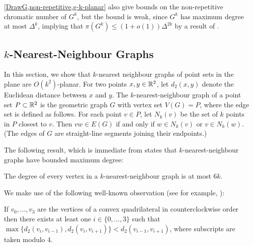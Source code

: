\documentclass{patmorin}
\renewcommand{\le}{\leqslant}
\renewcommand{\leq}{\leqslant}
\begin{document}
\cref{DrawG,non-repetitive,g-k-planar} also give bounds on the non-repetitive chromatic number of $G^k$, 
but the bound is weak, since $G^k$ has maximum degree at most $\Delta^k$, implying that $\pi(G^k) \leq (1+o(1))\Delta^{2k}$ by a result of \citet{DJKW16}.


\subsection{$k$-Nearest-Neighbour Graphs}

In this section, we show that $k$-nearest neighbour graphs of point sets in the plane are $O(k^2)$-planar.  For two points $x,y\in\mathbb{R}^2$, let $d_2(x,y)$ denote the Euclidean distance between $x$ and $y$. The $k$-nearest-neighbour graph of a point set $P\subset\mathbb{R}^2$ is the geometric graph $G$ with vertex set $V(G)=P$, where the edge set is defined as follows. For each point $v\in P$, let $N_k(v)$ be the set of $k$ points in $P$ closest to $v$. Then $vw\in E(G)$ if and only if $w\in N_k(v)$ or $v\in N_k(w)$. 
(The edges of $G$ are straight-line segments joining their endpoints.)

The following result, which is immediate from \citet[Corollary~4.2.6]{abrego.munroy.ea:on} states that $k$-nearest-neighbour graphs have bounded maximum degree:
\begin{lem}
\label{k-nn-max-degree}
The degree of every vertex in a $k$-nearest-neighbour graph is at most $6k$.
\end{lem}

We make use of the following well-known observation (see for example, \citet[Lemma~2]{bose.morin.ea:routing}):
\begin{obs}
\label{convex}
If $v_0,\ldots,v_3$ are the vertices of a convex quadrilateral in counterclockwise order then there exists at least one $i\in\{0,\ldots,3\}$ such that $\max\{d_2(v_i,v_{i-1}), d_2(v_i,v_{i+1})\} < d_2(v_{i-1},v_{i+1})$, where subscripts are taken modulo 4.
\end{obs}
\end{document}
